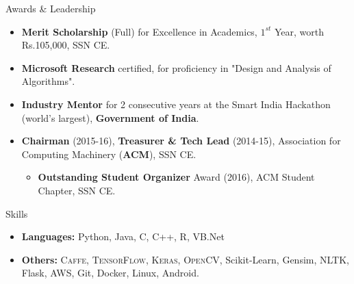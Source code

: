 \documentclass[]{mcdowellcv}
\begin{document}
	\begin{cvsection}{Awards \& Leadership}
		\begin{cvsubsection}{}{}{}
			\begin{itemize}
				\item \textbf{Merit Scholarship} (Full) for Excellence in Academics, $1^{st}$ Year, worth Rs.105,000, SSN CE.
                \item \textbf{Microsoft Research} certified, for proficiency in "Design and Analysis of Algorithms".
                \item \textbf{Industry Mentor} for 2 consecutive years at the Smart India Hackathon (world's largest), \textbf{Government of India}.
                \item \textbf{Chairman} (2015-16), \textbf{Treasurer \& Tech Lead} (2014-15), Association for Computing Machinery (\textbf{ACM}), SSN CE.
                \begin{itemize}
                \item \textbf{Outstanding Student Organizer} Award (2016), ACM Student Chapter, SSN CE.
                \end{itemize}
			\end{itemize}
		\end{cvsubsection}
	\end{cvsection}
	
	\begin{cvsection}{Skills}
		\begin{cvsubsection}{}{}{}
			\begin{itemize}
				\item \textbf{Languages:} Python, Java, C, C++, R, VB.Net
				\item \textbf{Others:} \textsc{Caffe, TensorFlow, Keras, OpenCV}, Scikit-Learn, Gensim, NLTK, Flask, AWS, Git, Docker, Linux, Android.
			\end{itemize}
		\end{cvsubsection}
	\end{cvsection}
	
\end{document}
